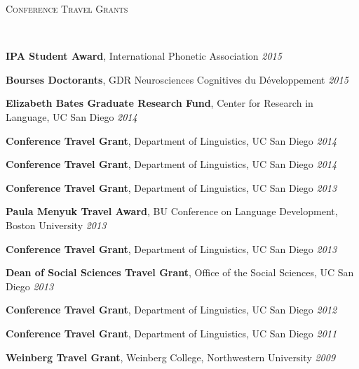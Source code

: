 \documentclass[9pt]{article}
\newenvironment{changemargin}[2]{%
  \begin{list}{}{%
    \setlength{\topsep}{0pt}%
    \setlength{\leftmargin}{#1}%
    \setlength{\rightmargin}{#2}%
    \setlength{\listparindent}{\parindent}%
    \setlength{\itemindent}{\parindent}%
    \setlength{\parsep}{\parskip}%
  }%
  \item[]}{\end{list}
}
\newcommand{\lineover}{
	\begin{changemargin}{-0.05in}{-0.05in}
		\vspace*{-8pt}
		\hrulefill \\
		\vspace*{-2pt}
	\end{changemargin}
}
\newcommand{\header}[1]{
	\begin{changemargin}{-0.5in}{-0.5in}
		\scshape{#1}\\
  	\lineover
	\end{changemargin}
}
\newenvironment{body} {
	\vspace*{-16pt}
	\begin{changemargin}{-0.25in}{-0.5in}
  }	
	{\end{changemargin}
}
\begin{document}
\smallskip


\header{Conference Travel Grants}

\begin{body}
	\vspace{14pt}
	
	\textbf{IPA Student Award}, International Phonetic Association \hfill {} \emph{2015}\\
	\medskip
	
	\textbf{Bourses Doctorants}, GDR Neurosciences Cognitives du D\'eveloppement \hfill {} \emph{2015}\\
	\medskip
	
	\textbf{Elizabeth Bates Graduate Research Fund}, Center for Research in Language, UC San Diego \hfill {} \emph{2014}\\
	\medskip

	\textbf{Conference Travel Grant}, Department of Linguistics, UC San Diego \hfill {} \emph{2014}\\
	\medskip

	\textbf{Conference Travel Grant}, Department of Linguistics, UC San Diego \hfill {} \emph{2014}\\
	\medskip
	
	\textbf{Conference Travel Grant}, Department of Linguistics, UC San Diego \hfill {} \emph{2013}\\
	\medskip

	\textbf{Paula Menyuk Travel Award}, BU Conference on Language Development, Boston University \hfill {} \emph{2013}\\
	\medskip

	\textbf{Conference Travel Grant}, Department of Linguistics, UC San Diego \hfill {} \emph{2013}\\
	\medskip
	
	\textbf{Dean of Social Sciences Travel Grant}, Office of the Social Sciences, UC San Diego \hfill {} \emph{2013}\\
	\medskip
		
	\textbf{Conference Travel Grant}, Department of Linguistics, UC San Diego \hfill {} \emph{2012}\\
	\medskip
	
	\textbf{Conference Travel Grant}, Department of Linguistics, UC San Diego \hfill {} \emph{2011}\\
	\medskip
	
	\textbf{Weinberg Travel Grant}, Weinberg College, Northwestern University \hfill {} \emph{2009}\\
	\medskip
		
\end{body}
\end{document}
